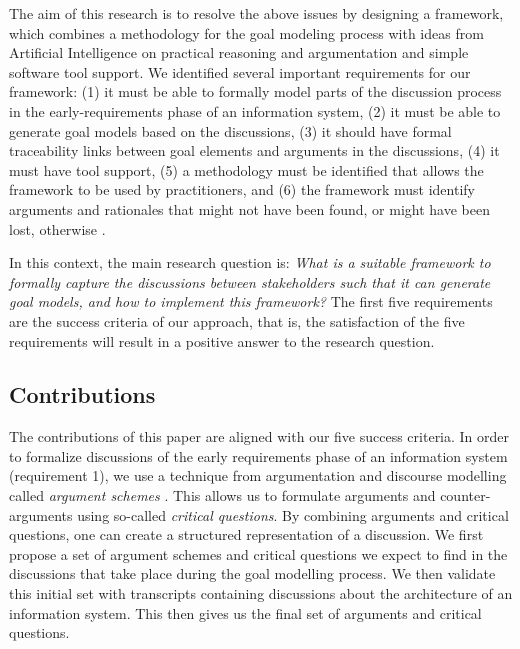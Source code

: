 The aim of this research is to resolve the above issues by designing a framework, which combines a methodology for the goal modeling process  with ideas from Artificial Intelligence on practical reasoning and argumentation \cite{atkinson2007} and simple software tool support. We identified several important requirements for our framework: (1) it must be able to formally model parts of the discussion process in the early-requirements phase of an information system, (2) it must be able to generate goal models based on the discussions, (3) it should have formal traceability links between goal elements and arguments in the discussions, (4) it must have tool support, (5) a methodology must be identified that allows the framework to be used by practitioners, and (6) the framework must identify arguments and rationales that might not have been found, or might have been lost, otherwise . 

In this context, the main research question is: \emph{What is a suitable framework to formally capture the discussions between stakeholders such that it can generate goal models, and how to implement this framework?} The first five requirements are the success criteria of our approach, that is, the satisfaction of the five requirements will result in a positive answer to the research question. 

\subsection{Contributions} 

The contributions of this paper are aligned with our five success criteria. In order to formalize discussions of the early requirements phase of an information system (requirement 1), we use a technique from argumentation and discourse modelling called \emph{argument schemes} \cite{walton-etal2004}. This allows us to formulate arguments and counter-arguments using so-called \emph{critical questions}. By combining arguments and critical questions, one can create a structured representation of a discussion. We first propose a set of argument schemes and critical questions we expect to find in the discussions that take place during the goal modelling process. We then validate this initial set with transcripts containing discussions about the architecture of an information system. This then gives us the final set of arguments and critical questions.

